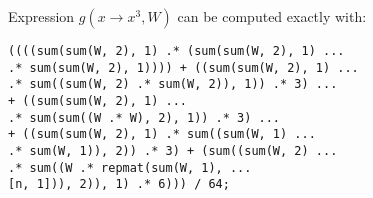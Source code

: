Expression $g(x \rightarrow x^3, W)$ can be computed exactly with:

\begingroup
    \fontsize{8pt}{12pt}\selectfont
\begin{verbatim}
((((sum(sum(W, 2), 1) .* (sum(sum(W, 2), 1) ...
.* sum(sum(W, 2), 1)))) + ((sum(sum(W, 2), 1) ...
.* sum((sum(W, 2) .* sum(W, 2)), 1)) .* 3) ...
+ ((sum(sum(W, 2), 1) ...
.* sum(sum((W .* W), 2), 1)) .* 3) ...
+ ((sum(sum(W, 2), 1) .* sum((sum(W, 1) ...
.* sum(W, 1)), 2)) .* 3) + (sum((sum(W, 2) ...
.* sum((W .* repmat(sum(W, 1), ...
[n, 1])), 2)), 1) .* 6))) / 64;
\end{verbatim}
\endgroup



